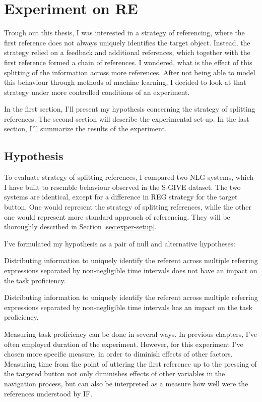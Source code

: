\chapter{Experiment on RE}
Trough out this thesis, I was interested in a strategy of referencing, where the first reference does not always uniquely identifies the target object. Instead, the strategy relied on a feedback and additional references, which together with the first reference formed a chain of references. I wondered, what is the effect of this splitting of the information across more references. After not being able to model this behaviour through methods of machine learning, I decided to look at that strategy under more controlled conditions of an experiment.

In the first section, I'll present my hypothesis concerning the strategy of splitting references. The second section will describe the experimental set-up. In the last section, I'll summarize the results of the experiment.

\section{Hypothesis}
To evaluate strategy of splitting references, I compared two NLG systems, which I have built to resemble behaviour observed in the S-GIVE dataset. The two systems are identical, except for a difference in REG strategy for the target button. One would represent the strategy of splitting references, while the other one would represent more standard approach of referencing. They will be thoroughly described in Section \ref{sec:exper-setup}.

I've formulated my hypothesis as a pair of null and alternative hypotheses:

\begin{nullhypo}
Distributing information to uniquely identify the referent across multiple referring expressions separated by non-negligible time intervals does not have an impact on the task proficiency.
\end{nullhypo}

\begin{alterhypo}
Distributing information to uniquely identify the referent across multiple referring expressions separated by non-negligible time intervals has an impact on the task proficiency.
\end{alterhypo}

Measuring task proficiency can be done in several ways. In previous chapters, I've often employed duration of the experiment. However, for this experiment I've chosen more specific measure, in order to diminish effects of other factors. Measuring time from the point of uttering the first reference up to the pressing of the targeted button not only diminishes effects of other variables in the navigation process, but can also be interpreted as a measure how well were the references understood by IF.

